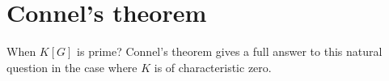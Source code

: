 \section{Connel's theorem}

When $K[G]$ is prime? Connel's theorem gives a full answer to this natural
question in the case where $K$ is of characteristic zero. 

%
%
%
%
%
%
